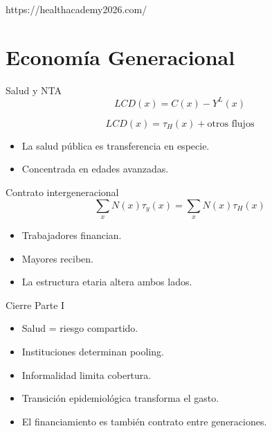https://healthacademy2026.com/\documentclass[10pt]{beamer}
\begin{document}
\section{Economía Generacional}

\begin{frame}{Salud y NTA}
\[
LCD(x)=C(x)-Y^L(x)
\]

\[
LCD(x)=\tau_H(x)+\text{otros flujos}
\]

\begin{itemize}
\item La salud pública es transferencia en especie.
\item Concentrada en edades avanzadas.
\end{itemize}
\end{frame}

\begin{frame}{Contrato intergeneracional}
\[
\sum_x N(x)\tau_y(x)
=
\sum_x N(x)\tau_H(x)
\]

\begin{itemize}
\item Trabajadores financian.
\item Mayores reciben.
\item La estructura etaria altera ambos lados.
\end{itemize}
\end{frame}

\begin{frame}{Cierre Parte I}
\begin{itemize}
\item Salud = riesgo compartido.
\item Instituciones determinan pooling.
\item Informalidad limita cobertura.
\item Transición epidemiológica transforma el gasto.
\item El financiamiento es también contrato entre generaciones.
\end{itemize}


\end{frame}
\end{document}
